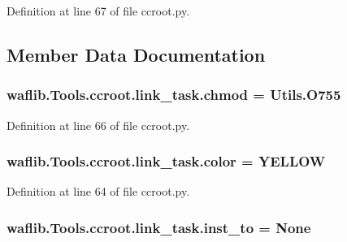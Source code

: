 Definition at line 67 of file ccroot.\+py.



\subsection{Member Data Documentation}
\subsubsection[{\texorpdfstring{chmod}{chmod}}]{\setlength{\rightskip}{0pt plus 5cm}waflib.\+Tools.\+ccroot.\+link\+\_\+task.\+chmod = {\bf Utils.\+O755}\hspace{0.3cm}{\ttfamily [static]}}\hypertarget{classwaflib_1_1_tools_1_1ccroot_1_1link__task_acdfa25918492c79bad5fb6f25ecfb0c0}{}\label{classwaflib_1_1_tools_1_1ccroot_1_1link__task_acdfa25918492c79bad5fb6f25ecfb0c0}


Definition at line 66 of file ccroot.\+py.

\subsubsection[{\texorpdfstring{color}{color}}]{ waflib.\+Tools.\+ccroot.\+link\+\_\+task.\+color = \textquotesingle{}Y\+E\+L\+L\+OW\textquotesingle{}\hspace{0.3cm}{\ttfamily [static]}}\hypertarget{classwaflib_1_1_tools_1_1ccroot_1_1link__task_a414adbb4f09e8b98edf04c6b18a916d0}{}\label{classwaflib_1_1_tools_1_1ccroot_1_1link__task_a414adbb4f09e8b98edf04c6b18a916d0}


Definition at line 64 of file ccroot.\+py.

\subsubsection[{\texorpdfstring{inst\+\_\+to}{inst_to}}]{\setlength{\rightskip}{0pt plus 5cm}waflib.\+Tools.\+ccroot.\+link\+\_\+task.\+inst\+\_\+to = None\hspace{0.3cm}{\ttfamily [static]}}\hypertarget{classwaflib_1_1_tools_1_1ccroot_1_1link__task_a8c0e47e7a5148f8d11799b58364257ef}{}\label{classwaflib_1_1_tools_1_1ccroot_1_1link__task_a8c0e47e7a5148f8d11799b58364257ef}


